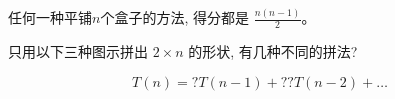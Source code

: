 \begin{frame}{}
  \begin{lemma}{}
    任何一种平铺$n$个盒子的方法, 得分都是 $\frac{n(n-1)}{2}$。
  \end{lemma}
\end{frame}

\begin{frame}{}
  \begin{exampleblock}{}
    只用以下三种图示拼出 $2 \times n$ 的形状, 有几种不同的拼法?
  \end{exampleblock}

  \[
    T(n) = ? T(n-1) + ?? T(n-2) + \dots
  \]
\end{frame}

